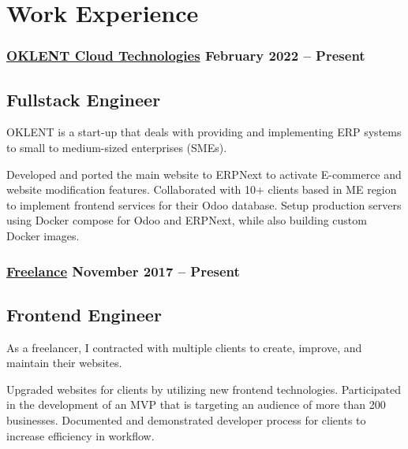 \section*{Work Experience}
%
%
%
\medskip
\subsubsection*{
  \href{https://oklent.com/}{OKLENT Cloud Technologies}
  \hspace*{\fill}
  February 2022 -- Present
}
\subsection*{Fullstack Engineer}
OKLENT is a start-up that deals with providing and implementing ERP systems to small to medium-sized enterprises (SMEs).\smallskip
\smallskip
\begin{tasks}
  \task Developed and ported the main website to ERPNext to activate E-commerce and website modification features.
  \task Collaborated with 10+ clients based in ME region to implement frontend services for their Odoo database.
  \task Setup production servers using Docker compose for Odoo and ERPNext, while also building custom Docker images.
\end{tasks}
%
%
\medskip
\subsubsection*{
  \href{https://bumbleboss.xyz/}{Freelance}
  \hspace*{\fill}
  November 2017 -- Present
}
\subsection*{Frontend Engineer}
As a freelancer, I contracted with multiple clients to create, improve, and maintain their websites.
\smallskip
\begin{tasks}
  \task Upgraded websites for clients by utilizing new frontend technologies.
  \task Participated in the development of an MVP that is targeting an audience of more than 200 businesses.
  \task Documented and demonstrated developer process for clients to increase efficiency in workflow.
\end{tasks}